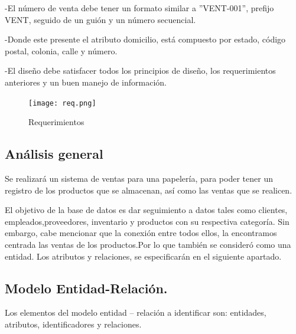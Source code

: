 \documentclass[30pt,fleqn]{article}
\begin{document}
-El número de venta debe tener un formato similar a ”VENT-001”, prefijo
VENT, seguido de un guión y un número secuencial.

-Donde este presente el atributo domicilio, está compuesto por estado,
código postal, colonia, calle y número.

-El diseño debe satisfacer todos los principios de diseño, los requerimientos
anteriores y un buen manejo de información.

\begin{figure}[h]
    \centering
    \texttt{[image: req.png]}
    \caption{Requerimientos}
    \label{fig:Requerimientos}
\end{figure}

\subsection{Análisis general}

\vspace{5mm} %

Se realizará un sistema de ventas para una papelería, para poder tener un registro de los productos que se almacenan, así como las ventas que se realicen.

El objetivo de la base de datos es dar seguimiento a datos tales como clientes, empleados,proveedores, inventario y productos con su respectiva categoría. Sin embargo, cabe mencionar que la conexión entre todos ellos, la encontramos centrada las ventas de los productos.Por lo que también se consideró como una entidad. Los atributos y relaciones, se especificarán en el siguiente apartado.




\subsection{Modelo Entidad-Relación.}

\vspace{5mm} %

Los elementos del modelo entidad – relación  a identificar son: entidades, atributos, identificadores y relaciones.

\vspace{5mm} %
\end{document}
